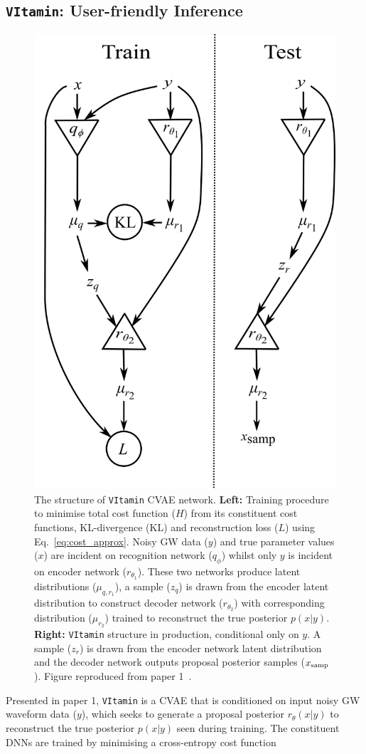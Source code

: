 \documentclass[a4paper]{jpconf}
\begin{document}
\subsection{\textup{\texttt{VItamin}}: User-friendly Inference}\label{intro:vit}

\begin{figure}
	\centering
	\includegraphics[width=.5\linewidth]{figs/network_setup.png}
	\caption{The structure of \texttt{VItamin} \ac{CVAE} network. \textbf{Left:} Training procedure to minimise total cost function ($H$) from its constituent cost functions, KL-divergence (KL) and reconstruction loss ($L$) using Eq.~\ref{eq:cost_approx}. Noisy GW data ($y$) and true parameter values ($x$) are incident on recognition network ($q_\phi$) whilst only $y$ is incident on encoder network ($r_{\theta_1}$). These two networks produce latent distributions ($\mu_{q,r_1}$), a sample ($z_q$) is drawn from the encoder latent distribution to construct decoder network ($r_{\theta_2}$) with corresponding distribution ($\mu_{r_2}$) trained to reconstruct the true posterior $p(x|y)$. \textbf{Right:} \texttt{VItamin} structure in production, conditional only on $y$. A sample ($z_r$) is drawn from the encoder network latent distribution and the decoder network outputs proposal posterior samples ($x_\textup{samp}$). Figure reproduced from paper 1~\cite{vitpaper}.}
	\label{fig:vit_flow}
\end{figure}

Presented in paper 1, \texttt{VItamin} is a \ac{CVAE} that is conditioned on input noisy GW waveform data ($y$), which seeks to generate a proposal posterior $r_\theta(x|y)$ to reconstruct the true posterior $p(x|y)$ seen during training. The constituent DNNs are trained by minimising a cross-entropy cost function
\end{document}
